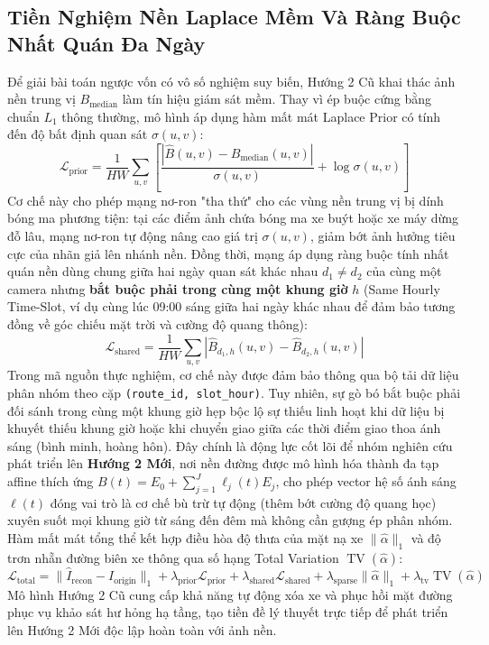 \documentclass[11pt,a4paper]{article}
\begin{document}
\subsection{Tiền Nghiệm Nền Laplace Mềm Và Ràng Buộc Nhất Quán Đa Ngày}
Để giải bài toán ngược vốn có vô số nghiệm suy biến, Hướng 2 Cũ khai thác ảnh nền trung vị $B_{\text{median}}$ làm tín hiệu giám sát mềm. Thay vì ép buộc cứng bằng chuẩn $L_1$ thông thường, mô hình áp dụng hàm mất mát Laplace Prior có tính đến độ bất định quan sát $\sigma(u, v)$:
\begin{equation}
    \mathcal{L}_{\text{prior}} = \frac{1}{HW} \sum_{u, v} \left[ \frac{|\hat{B}(u, v) - B_{\text{median}}(u, v)|}{\sigma(u, v)} + \log \sigma(u, v) \right]
\end{equation}
Cơ chế này cho phép mạng nơ-ron "tha thứ" cho các vùng nền trung vị bị dính bóng ma phương tiện: tại các điểm ảnh chứa bóng ma xe buýt hoặc xe máy dừng đỗ lâu, mạng nơ-ron tự động nâng cao giá trị $\sigma(u, v)$, giảm bớt ảnh hưởng tiêu cực của nhãn giả lên nhánh nền.
Đồng thời, mạng áp dụng ràng buộc tính nhất quán nền dùng chung giữa hai ngày quan sát khác nhau $d_1 \ne d_2$ của cùng một camera nhưng \textbf{bắt buộc phải trong cùng một khung giờ} $h$ (Same Hourly Time-Slot, ví dụ cùng lúc 09:00 sáng giữa hai ngày khác nhau để đảm bảo tương đồng về góc chiếu mặt trời và cường độ quang thông):
\begin{equation}
    \mathcal{L}_{\text{shared}} = \frac{1}{HW} \sum_{u, v} |\hat{B}_{d_1, h}(u, v) - \hat{B}_{d_2, h}(u, v)|
\end{equation}
Trong mã nguồn thực nghiệm, cơ chế này được đảm bảo thông qua bộ tải dữ liệu phân nhóm theo cặp \texttt{(route\_id, slot\_hour)}. Tuy nhiên, sự gò bó bắt buộc phải đối sánh trong cùng một khung giờ hẹp bộc lộ sự thiếu linh hoạt khi dữ liệu bị khuyết thiếu khung giờ hoặc khi chuyển giao giữa các thời điểm giao thoa ánh sáng (bình minh, hoàng hôn). Đây chính là động lực cốt lõi để nhóm nghiên cứu phát triển lên \textbf{Hướng 2 Mới}, nơi nền đường được mô hình hóa thành đa tạp affine thích ứng $B(t) = E_0 + \sum_{j=1}^J \ell_j(t) E_j$, cho phép vector hệ số ánh sáng $\bm{\ell}(t)$ đóng vai trò là cơ chế bù trừ tự động (thêm bớt cường độ quang học) xuyên suốt mọi khung giờ từ sáng đến đêm mà không cần gượng ép phân nhóm.
Hàm mất mát tổng thể kết hợp điều hòa độ thưa của mặt nạ xe $\|\hat{\alpha}\|_1$ và độ trơn nhẵn đường biên xe thông qua số hạng Total Variation $\operatorname{TV}(\hat{\alpha})$:
\begin{equation}
    \mathcal{L}_{\text{total}} = \|\hat{I}_{\text{recon}} - I_{\text{origin}}\|_1 + \lambda_{\text{prior}} \mathcal{L}_{\text{prior}} + \lambda_{\text{shared}} \mathcal{L}_{\text{shared}} + \lambda_{\text{sparse}} \|\hat{\alpha}\|_1 + \lambda_{\text{tv}} \operatorname{TV}(\hat{\alpha})
\end{equation}
Mô hình Hướng 2 Cũ cung cấp khả năng tự động xóa xe và phục hồi mặt đường phục vụ khảo sát hư hỏng hạ tầng, tạo tiền đề lý thuyết trực tiếp để phát triển lên Hướng 2 Mới độc lập hoàn toàn với ảnh nền.
\end{document}
